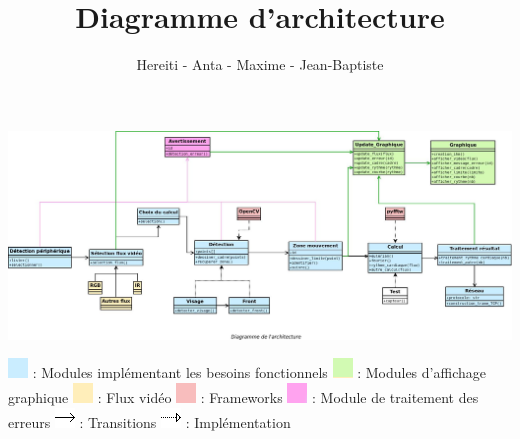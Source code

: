\documentclass[12pt,a4paper]{article}
\title{Diagramme d'architecture}
\author{Hereiti \bsc{Hatitio} - Anta \bsc{Mbaye} - Maxime \bsc{Vincent} - Jean-Baptiste \bsc{Rey}}
\begin{document}
\maketitle

\newpage
\vspace*{-1.6in}
\vspace*{-\the\hoffset}
\thispagestyle{empty}
\includegraphics[scale=0.4,angle=90]{archi2.jpeg}
\begin{center}

\end{center}
\vspace*{-1in}
\vspace*{-\the\hoffset}
\includegraphics[scale=0.5]{bleu.png} : Modules implémentant les besoins fonctionnels\newline
\includegraphics[scale=0.5]{vert.png} : Modules d'affichage graphique\newline
\includegraphics[scale=0.5]{orange.png} : Flux vidéo\newline
\includegraphics[scale=0.5]{rouge.png} : Frameworks\newline
\includegraphics[scale=0.5]{rose.png} :  Module de traitement des erreurs\newline
\includegraphics[scale=0.5]{fleche.png} :  Transitions\newline
\includegraphics[scale=0.5]{fleche_pointille.png} :  Implémentation\newline
\end{document}
